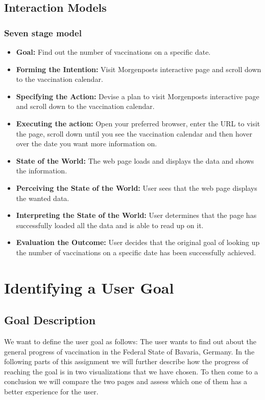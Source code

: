 \documentclass[12pt, letterpaper]{article}
\begin{document}
\subsection{Interaction Models}
\subsubsection{Seven stage model}
\begin{itemize}
    \item\textbf{Goal:}
    Find out the number of vaccinations on a specific date.
    \item\textbf{Forming the Intention:}
    Visit Morgenposts interactive page and scroll down to the vaccination calendar.
    \item\textbf{Specifying the Action:}
    Devise a plan to visit Morgenposts interactive page and scroll down to the vaccination calendar.
    \item\textbf{Executing the action:}
    Open your preferred browser, enter the URL to visit the page, scroll down until you see the vaccination calendar and then hover over the date you want more information on.
    \item\textbf{State of the World:}
    The web page loads and displays the data and shows the information.
    \item\textbf{Perceiving the State of the World:}
    User sees that the web page displays the wanted data.
    \item\textbf{Interpreting the State of the World:}
    User determines that the page has successfully loaded all the data and is able to read up on it.
    \item\textbf{Evaluation the Outcome:}
    User decides that the original goal of looking up the number of vaccinations on a specific date has been successfully achieved.
\end{itemize}
\newpage

\section{Identifying a User Goal}
\subsection{Goal Description}
We want to define the user goal as follows: The user wants to find out about the general progress of vaccination in the Federal State of Bavaria, Germany. In the following parts of this assignment we will further describe how the progress of reaching the goal is in two visualizations that we have chosen. To then come to a conclusion we will compare the two pages and assess which one of them has a better experience for the user.
\end{document}
